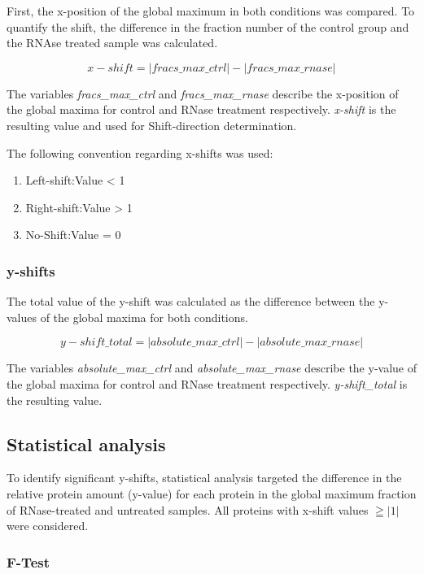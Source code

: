 \documentclass[
]{article}
\begin{document}
First, the x-position of the global maximum in both conditions was
compared. To quantify the shift, the difference in the fraction number
of the control group and the RNAse treated sample was calculated.

\[x-shift = |fracs\_max\_ctrl| - |fracs\_max\_rnase|\]

The variables \emph{fracs\_max\_ctrl} and \emph{fracs\_max\_rnase}
describe the x-position of the global maxima for control and RNase
treatment respectively. \emph{x-shift} is the resulting value and used
for Shift-direction determination.

The following convention regarding x-shifts was used:

\begin{enumerate}
\def\labelenumi{\arabic{enumi}.}
\item
  Left-shift:\tab    Value \textless{} 1
\item
  Right-shift:\tab   Value \textgreater{} 1
\item
  No-Shift:\tab      Value = 0
\end{enumerate}

\hypertarget{y-shifts}{%
\subsubsection{y-shifts}\label{y-shifts}}

The total value of the y-shift was calculated as the difference between
the y-values of the global maxima for both conditions.

\[y-shift\_total = |absolute\_max\_ctrl| - |absolute\_max\_rnase|\]

The variables \emph{absolute\_max\_ctrl} and \emph{absolute\_max\_rnase}
describe the y-value of the global maxima for control and RNase
treatment respectively. \emph{y-shift\_total} is the resulting value.

\hypertarget{statistical-analysis}{%
\subsection{Statistical analysis}\label{statistical-analysis}}

To identify significant y-shifts, statistical analysis targeted the
difference in the relative protein amount (y-value) for each protein in
the global maximum fraction of RNase-treated and untreated samples. All
proteins with x-shift values \(\geqq |1|\) were considered.

\hypertarget{f-test}{%
\subsubsection{F-Test}\label{f-test}}
\end{document}
